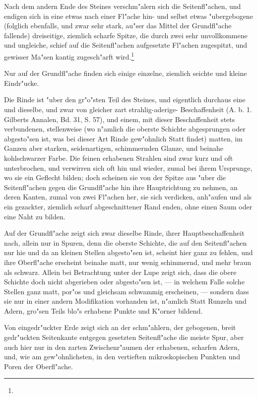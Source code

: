 \documentclass[a4paper, 11pt, oneside, german]{article}
\begin{document}
Nach dem andern Ende des Steines verschm"alern sich die Seitenfl"achen, und endigen sich in eine etwas nach einer Fl"ache hin- und selbst etwas "ubergebogene (folglich ebenfalls, und zwar sehr stark, au"ser das Mittel der Grundfl"ache fallende) dreiseitige, ziemlich scharfe Spitze, die durch zwei sehr unvollkommene und ungleiche, schief auf die Seitenfl"achen aufgesetzte Fl"achen zugespitzt, und gewisser Ma"sen kantig zugesch"arft wird.\footnote{}

Nur auf der Grundfl"ache finden sich einige einzelne, ziemlich seichte und kleine Eindr"ucke.

Die Rinde ist "uber den gr"o"sten Teil des Steines, und eigentlich durchaus eine und dieselbe, und zwar von gleicher zart strahlig-aderige- Beschaffenheit (A. b. 1. Gilberts Annalen, Bd. 31, S. 57), und einem, mit dieser Beschaffenheit stets verbundenen, stellenweise (wo n"amlich die oberste Schichte abgesprungen oder abgesto"sen ist, was bei dieser Art Rinde gew"ohnlich Statt findet) matten, im Ganzen aber starken, seidenartigen, schimmernden Glanze, und beinahe kohlschwarzer Farbe. Die feinen erhabenen Strahlen sind zwar kurz und oft unterbrochen, und verwirren sich oft hin und wieder, zumal bei ihrem Ursprunge, wo sie ein Geflecht bilden; doch scheinen sie von der Spitze aus "uber die Seitenfl"achen gegen die Grundfl"ache hin ihre Hauptrichtung zu nehmen, an deren Kanten, zumal von zwei Fl"achen her, sie sich verdicken, anh"aufen und als ein gezackter, ziemlich scharf abgeschnittener Rand enden, ohne einen Saum oder eine Naht zu bilden.

Auf der Grundfl"ache zeigt sich zwar dieselbe Rinde, ihrer Hauptbeschaffenheit nach, allein nur in Spuren, denn die oberste Schichte, die auf den Seitenfl"achen nur hie und da an kleinen Stellen abgesto"sen ist, scheint hier ganz zu fehlen, und ihre Oberfl"ache erscheint beinahe matt, nur wenig schimmernd, und mehr braun als schwarz. Allein bei Betrachtung unter der Lupe zeigt sich, dass die obere Schichte doch nicht abgerieben oder abgesto"sen ist, --- in welchem Falle solche Stellen ganz matt, por"os und gleichsam schwammig erscheinen, --- sondern dass sie nur in einer andern Modifikation vorhanden ist, n"amlich Statt Runzeln und Adern, gro"sen Teils blo"s erhabene Punkte und K"orner bildend.

Von eingedr"uckter Erde zeigt sich an der schm"ahlern, der gebogenen, breit gedr"uckten Seitenkante entgegen gesetzten Seitenfl"ache die meiste Spur, aber auch hier nur in den zarten Zwischenr"aumen der erhabenen, scharfen Adern, und, wie am gew"ohnlichsten, in den vertieften mikroskopischen Punkten und Poren der Oberfl"ache.
\end{document}
